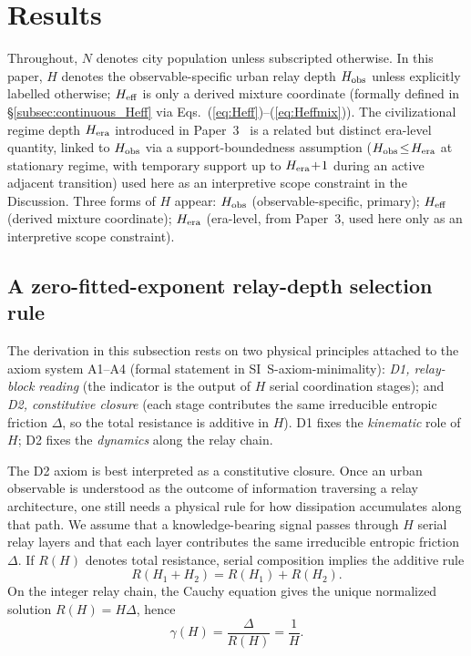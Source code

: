\section{Results}

Throughout, $N$ denotes city population unless subscripted otherwise. In this paper, $H$ denotes the observable-specific urban relay depth $H_{\rm obs}$ unless explicitly labelled otherwise; $H_{\rm eff}$ is only a derived mixture coordinate (formally defined in \S\ref{subsec:continuous_Heff} via Eqs.~(\ref{eq:Heff})--(\ref{eq:Heffmix})). The civilizational regime depth $H_{\rm era}$ introduced in Paper~3~\cite{Kato2026c} is a related but distinct era-level quantity, linked to $H_{\rm obs}$ via a support-boundedness assumption ($H_{\rm obs}\!\leq\!H_{\rm era}$ at stationary regime, with temporary support up to $H_{\rm era}\!+\!1$ during an active adjacent transition) used here as an interpretive scope constraint in the Discussion. Three forms of $H$ appear: $H_{\rm obs}$ (observable-specific, primary); $H_{\rm eff}$ (derived mixture coordinate); $H_{\rm era}$ (era-level, from Paper~3, used here only as an interpretive scope constraint).

\subsection{A zero-fitted-exponent relay-depth selection rule}

The derivation in this subsection rests on two physical principles attached to the axiom system A1--A4 (formal statement in SI~\textsf{S-axiom-minimality}): \textit{D1, relay-block reading} (the indicator is the output of \(H\) serial coordination stages); and \textit{D2, constitutive closure} (each stage contributes the same irreducible entropic friction \(\Delta\), so the total resistance is additive in \(H\)). D1 fixes the \textit{kinematic} role of \(H\); D2 fixes the \textit{dynamics} along the relay chain.

The D2 axiom is best interpreted as a constitutive closure.
Once an urban observable is understood as the outcome of information traversing
a relay architecture, one still needs a physical rule for how dissipation
accumulates along that path.
We assume that a knowledge-bearing signal passes through \(H\) serial relay
layers and that each layer contributes the same irreducible entropic friction
\(\Delta\).
If \(R(H)\) denotes total resistance, serial composition implies the additive
rule
\begin{equation}
R(H_1+H_2)=R(H_1)+R(H_2).
\label{eq:cauchy}
\end{equation}
On the integer relay chain, the Cauchy equation gives the unique normalized
solution \(R(H)=H\Delta\), hence
\begin{equation}
\gamma(H)=\frac{\Delta}{R(H)}=\frac{1}{H}.
\label{eq:gamma}
\end{equation}

